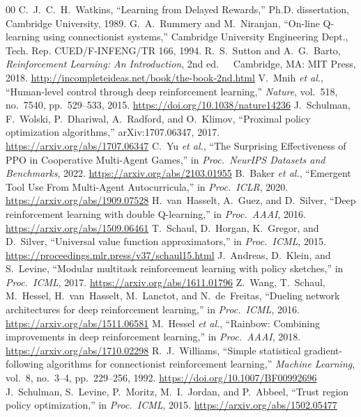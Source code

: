 \documentclass[conference]{IEEEtran}
\begin{document}
\begin{thebibliography}{00}
 C.~J.~C.~H.~Watkins, ``Learning from Delayed Rewards,'' Ph.D. dissertation, Cambridge University, 1989.
 G.~A.~Rummery and M.~Niranjan, ``On-line Q-learning using connectionist systems,'' Cambridge University Engineering Dept., Tech. Rep. CUED/F-INFENG/TR 166, 1994.
 R.~S.~Sutton and A.~G.~Barto, \emph{Reinforcement Learning: An Introduction}, 2nd ed.\ \ \ Cambridge, MA: MIT Press, 2018. \url{http://incompleteideas.net/book/the-book-2nd.html}
 V.~Mnih \emph{et al.}, ``Human-level control through deep reinforcement learning,'' \emph{Nature}, vol.~518, no.~7540, pp.~529--533, 2015. \url{https://doi.org/10.1038/nature14236}
 J.~Schulman, F.~Wolski, P.~Dhariwal, A.~Radford, and O.~Klimov, ``Proximal policy optimization algorithms,'' arXiv:1707.06347, 2017. \url{https://arxiv.org/abs/1707.06347}
 C.~Yu \emph{et al.}, ``The Surprising Effectiveness of PPO in Cooperative Multi-Agent Games,'' in \emph{Proc.\ NeurIPS Datasets and Benchmarks}, 2022. \url{https://arxiv.org/abs/2103.01955}
 B.~Baker \emph{et al.}, ``Emergent Tool Use From Multi-Agent Autocurricula,'' in \emph{Proc.\ ICLR}, 2020. \url{https://arxiv.org/abs/1909.07528}
 H.~van~Hasselt, A.~Guez, and D.~Silver, ``Deep reinforcement learning with double Q-learning,'' in \emph{Proc.\ AAAI}, 2016. \url{https://arxiv.org/abs/1509.06461}
 T.~Schaul, D.~Horgan, K.~Gregor, and D.~Silver, ``Universal value function approximators,'' in \emph{Proc.\ ICML}, 2015. \url{https://proceedings.mlr.press/v37/schaul15.html}
 J.~Andreas, D.~Klein, and S.~Levine, ``Modular multitask reinforcement learning with policy sketches,'' in \emph{Proc.\ ICML}, 2017. \url{https://arxiv.org/abs/1611.01796}
 Z.~Wang, T.~Schaul, M.~Hessel, H.~van~Hasselt, M.~Lanctot, and N.~de~Freitas, ``Dueling network architectures for deep reinforcement learning,'' in \emph{Proc.\ ICML}, 2016. \url{https://arxiv.org/abs/1511.06581}
 M.~Hessel \emph{et al.}, ``Rainbow: Combining improvements in deep reinforcement learning,'' in \emph{Proc.\ AAAI}, 2018. \url{https://arxiv.org/abs/1710.02298}
 R.~J.~Williams, ``Simple statistical gradient-following algorithms for connectionist reinforcement learning,'' \emph{Machine Learning}, vol.~8, no.~3--4, pp.~229--256, 1992. \url{https://doi.org/10.1007/BF00992696}
 J.~Schulman, S.~Levine, P.~Moritz, M.~I.~Jordan, and P.~Abbeel, ``Trust region policy optimization,'' in \emph{Proc.\ ICML}, 2015. \url{https://arxiv.org/abs/1502.05477}

\end{thebibliography}
\end{document}
